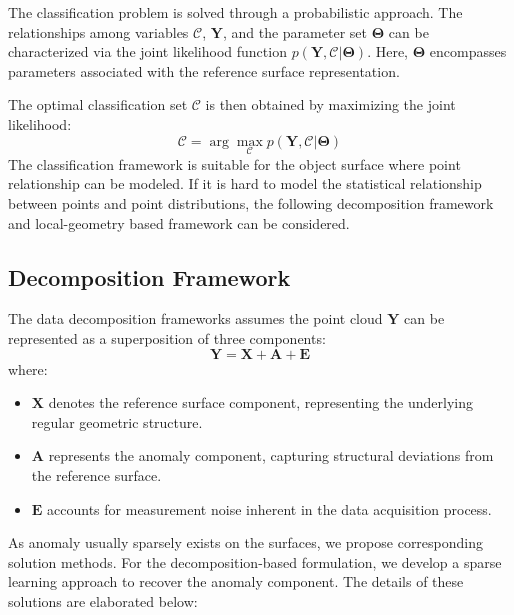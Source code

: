 The classification problem is solved through a probabilistic approach. The relationships among variables \(\mathcal{C}\), \(\mathbf{Y}\), and the parameter set \(\mathbf{\Theta}\) can be characterized via the joint likelihood function \(p(\mathbf{Y}, \mathcal{C}|\mathbf{\Theta})\). Here, \(\mathbf{\Theta}\) encompasses parameters associated with the reference surface representation.

The optimal classification set \(\mathcal{C}\) is then obtained by maximizing the joint likelihood:
\begin{equation}
    \mathcal{C} = \arg\max\limits_{\mathcal{C}}p(\mathbf{Y}, \mathcal{C}|\mathbf{\Theta})
\end{equation}
The classification framework is suitable for the object surface where point relationship can be modeled. If it is hard to model the statistical relationship between points and point distributions, the following decomposition framework and local-geometry based framework can be considered. 

\subsection{Decomposition Framework}
The data decomposition frameworks assumes the point cloud \(\mathbf{Y}\) can be represented as a superposition of three components:
\begin{equation}
    \mathbf{Y} = \mathbf{X} + \mathbf{A} + \mathbf{E}
\end{equation}
where:
\begin{itemize}[itemsep=1pt]
    \item \(\mathbf{X}\) denotes the reference surface component, representing the underlying regular geometric structure.
    \item \(\mathbf{A}\) represents the anomaly component, capturing structural deviations from the reference surface.
    \item \(\mathbf{E}\) accounts for measurement noise inherent in the data acquisition process.
\end{itemize}
    
As anomaly usually sparsely exists on the surfaces, we propose corresponding solution methods. For the decomposition-based formulation, we develop a sparse learning approach to recover the anomaly component. The details of these solutions are elaborated below:

